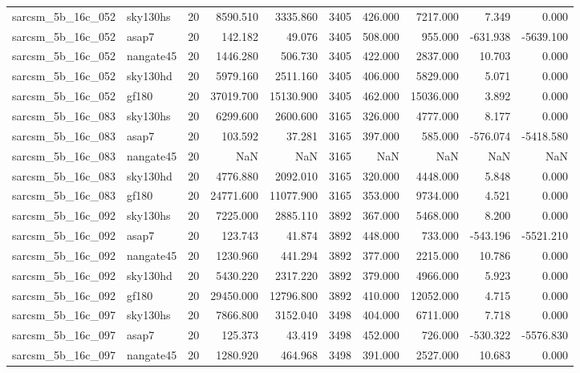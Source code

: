 \begin{longtable}{llrrrrrrrr}
sarcsm\_5b\_16c\_052 & sky130hs & 20 & 8590.510 & 3335.860 & 3405 & 426.000 & 7217.000 & 7.349 & 0.000 \\
sarcsm\_5b\_16c\_052 & asap7 & 20 & 142.182 & 49.076 & 3405 & 508.000 & 955.000 & -631.938 & -5639.100 \\
sarcsm\_5b\_16c\_052 & nangate45 & 20 & 1446.280 & 506.730 & 3405 & 422.000 & 2837.000 & 10.703 & 0.000 \\
sarcsm\_5b\_16c\_052 & sky130hd & 20 & 5979.160 & 2511.160 & 3405 & 406.000 & 5829.000 & 5.071 & 0.000 \\
sarcsm\_5b\_16c\_052 & gf180 & 20 & 37019.700 & 15130.900 & 3405 & 462.000 & 15036.000 & 3.892 & 0.000 \\
sarcsm\_5b\_16c\_083 & sky130hs & 20 & 6299.600 & 2600.600 & 3165 & 326.000 & 4777.000 & 8.177 & 0.000 \\
sarcsm\_5b\_16c\_083 & asap7 & 20 & 103.592 & 37.281 & 3165 & 397.000 & 585.000 & -576.074 & -5418.580 \\
sarcsm\_5b\_16c\_083 & nangate45 & 20 & NaN & NaN & 3165 & NaN & NaN & NaN & NaN \\
sarcsm\_5b\_16c\_083 & sky130hd & 20 & 4776.880 & 2092.010 & 3165 & 320.000 & 4448.000 & 5.848 & 0.000 \\
sarcsm\_5b\_16c\_083 & gf180 & 20 & 24771.600 & 11077.900 & 3165 & 353.000 & 9734.000 & 4.521 & 0.000 \\
sarcsm\_5b\_16c\_092 & sky130hs & 20 & 7225.000 & 2885.110 & 3892 & 367.000 & 5468.000 & 8.200 & 0.000 \\
sarcsm\_5b\_16c\_092 & asap7 & 20 & 123.743 & 41.874 & 3892 & 448.000 & 733.000 & -543.196 & -5521.210 \\
sarcsm\_5b\_16c\_092 & nangate45 & 20 & 1230.960 & 441.294 & 3892 & 377.000 & 2215.000 & 10.786 & 0.000 \\
sarcsm\_5b\_16c\_092 & sky130hd & 20 & 5430.220 & 2317.220 & 3892 & 379.000 & 4966.000 & 5.923 & 0.000 \\
sarcsm\_5b\_16c\_092 & gf180 & 20 & 29450.000 & 12796.800 & 3892 & 410.000 & 12052.000 & 4.715 & 0.000 \\
sarcsm\_5b\_16c\_097 & sky130hs & 20 & 7866.800 & 3152.040 & 3498 & 404.000 & 6711.000 & 7.718 & 0.000 \\
sarcsm\_5b\_16c\_097 & asap7 & 20 & 125.373 & 43.419 & 3498 & 452.000 & 726.000 & -530.322 & -5576.830 \\
sarcsm\_5b\_16c\_097 & nangate45 & 20 & 1280.920 & 464.968 & 3498 & 391.000 & 2527.000 & 10.683 & 0.000 \\

\end{longtable}
